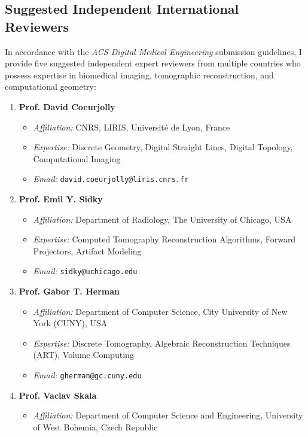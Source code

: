 \documentclass[11pt]{article}
\begin{document}
\subsection*{Suggested Independent International Reviewers}
In accordance with the \textit{ACS Digital Medical Engineering} submission guidelines, I provide five suggested independent expert reviewers from multiple countries who possess expertise in biomedical imaging, tomographic reconstruction, and computational geometry:

\begin{enumerate}
    \item \textbf{Prof. David Coeurjolly}
    \begin{itemize}
        \item \textit{Affiliation:} CNRS, LIRIS, Université de Lyon, France
        \item \textit{Expertise:} Discrete Geometry, Digital Straight Lines, Digital Topology, Computational Imaging
        \item \textit{Email:} \texttt{david.coeurjolly@liris.cnrs.fr}
    \end{itemize}
    \item \textbf{Prof. Emil Y. Sidky}
    \begin{itemize}
        \item \textit{Affiliation:} Department of Radiology, The University of Chicago, USA
        \item \textit{Expertise:} Computed Tomography Reconstruction Algorithms, Forward Projectors, Artifact Modeling
        \item \textit{Email:} \texttt{sidky@uchicago.edu}
    \end{itemize}
    \item \textbf{Prof. Gabor T. Herman}
    \begin{itemize}
        \item \textit{Affiliation:} Department of Computer Science, City University of New York (CUNY), USA
        \item \textit{Expertise:} Discrete Tomography, Algebraic Reconstruction Techniques (ART), Volume Computing
        \item \textit{Email:} \texttt{gherman@gc.cuny.edu}
    \end{itemize}
    \item \textbf{Prof. Vaclav Skala}
    \begin{itemize}
        \item \textit{Affiliation:} Department of Computer Science and Engineering, University of West Bohemia, Czech Republic

\end{itemize}
\end{enumerate}
\end{document}
